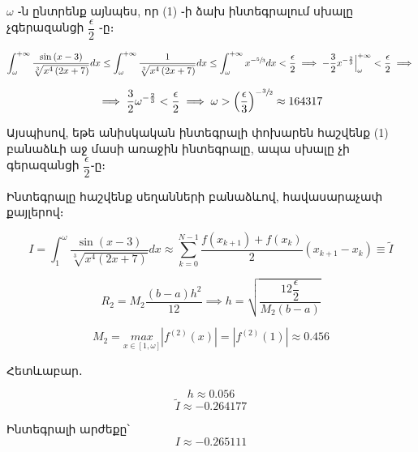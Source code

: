 \documentclass{article}
\begin{document}
$\omega$ ֊ն ընտրենք այնպես, որ (1) ֊ի ձախ ինտեգրալում սխալը չգերազանցի $\dfrac{\epsilon}{2}$ ֊ը։

		$$\int_{\omega}^{+\infty}\dfrac{\sin\left(x - 3\right)}{\sqrt[3]{x^{4}\left(2x+7\right)}}dx  \leq \int_{\omega}^{+\infty}\dfrac{1}{\sqrt[3]{x^{4}\left(2x+7\right)}}dx \leq
		\int_{\omega}^{+\infty} x ^ {-\sfrac{5}{3}} dx < \dfrac{\epsilon}{2} \implies -\frac{3}{2} x ^ {-\frac{2}{3}} \Big |_{\omega}^{+\infty}  < \dfrac{\epsilon}{2} \implies$$

		$$ \implies\frac{3}{2}\omega^{-\frac{2}{3}} < \frac{\epsilon}{2} \implies \omega > \left(\dfrac{\epsilon}{3} \right)^{-\sfrac{3}{2}} \approx 164317$$


Այսպիսով, եթե անիսկական ինտեգրալի փոխարեն հաշվենք (1) բանաձևի աջ մասի առաջին ինտեգրալը, ապա սխալը չի գերազանցի $\dfrac{\epsilon}{2}$֊ը։

Ինտեգրալը հաշվենք սեղանների բանաձևով, հավասարաչափ քայլերով։

							$$I = \int_{1}^{\omega}\dfrac{\sin\left(x - 3\right)}{\sqrt[3]{x^{4}\left(2x+7\right)}}dx \approx  \sum_{k = 0}^{N - 1} \dfrac{f\left(x_{k+1}\right) + f\left(x_{k}\right)}{2}\left(x_{k + 1} - x_{k}\right) \equiv \tilde{I}$$

							$$R_2 = M_{2} \dfrac{\left(b - a\right)h^{2}}{12} \implies h = \sqrt{\dfrac{12 \dfrac{\epsilon}{2}}{M_{2}\left(b - a\right)}}$$
					
								$$M_{2} = \underset{x \in \left[1, \omega\right]}{max}\left|f^{\left(2\right)}\left(x\right)\right| = \left|f^{\left(2\right)}\left(1\right)\right| \approx 0.456$$

Հետևաբար․
					
							$$h \approx 0.056$$
							$$\tilde{I} \approx -0.264177$$

Ինտեգրալի արժեքը՝  $$ I \approx -0.265111$$
\end{document}

